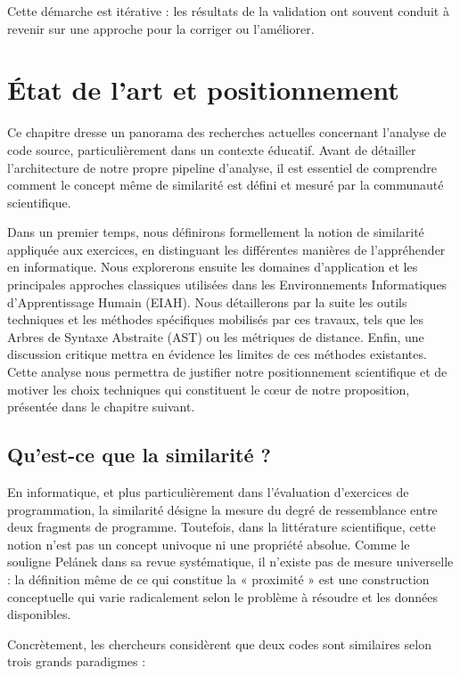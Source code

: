 \documentclass[12pt,a4paper,oneside]{report}
\begin{document}
Cette démarche est itérative : les résultats de la validation ont souvent
conduit à revenir sur une approche pour la corriger ou l'améliorer.


\chapter{État de l'art et positionnement}

Ce chapitre dresse un panorama des recherches actuelles concernant l'analyse de 
code source, particulièrement dans un contexte éducatif. Avant de détailler 
l'architecture de notre propre pipeline d'analyse, il est essentiel de comprendre
 comment le concept même de similarité est défini et mesuré par la communauté 
 scientifique. 

Dans un premier temps, nous définirons formellement la notion de similarité 
appliquée aux exercices, en distinguant les différentes manières 
de l'appréhender en informatique. Nous explorerons ensuite les domaines d'application et les 
principales approches classiques utilisées dans les Environnements Informatiques
d'Apprentissage Humain (EIAH). Nous détaillerons par la suite les outils techniques et 
les méthodes spécifiques mobilisés par ces travaux, tels que les Arbres de Syntaxe Abstraite (AST)
ou les métriques de distance. Enfin, une discussion critique mettra en évidence 
les limites de ces méthodes existantes. Cette analyse nous permettra de justifier
notre positionnement scientifique et de motiver les choix techniques qui 
constituent le cœur de notre proposition, présentée dans le chapitre suivant.

\section{Qu'est-ce que la similarité ?}

En informatique, et plus particulièrement dans l'évaluation d'exercices de programmation, la similarité désigne la mesure du degré de ressemblance entre deux fragments de programme. Toutefois, dans la littérature scientifique, cette notion n'est pas un concept univoque ni une propriété absolue. Comme le souligne Pelánek \cite{pelanek_2020} dans sa revue systématique, il n'existe pas de mesure universelle : la définition même de ce qui constitue la « proximité » est une construction conceptuelle qui varie radicalement selon le problème à résoudre et les données disponibles.

 Concrètement, les chercheurs considèrent que deux codes sont similaires selon trois grands paradigmes :
\end{document}

